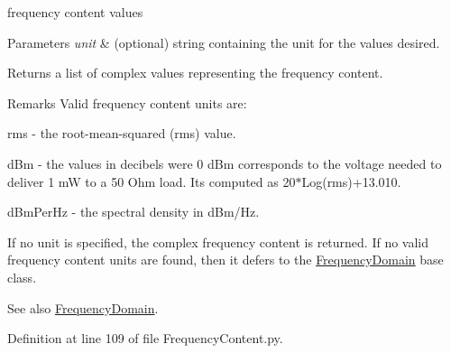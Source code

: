 frequency content values 


\begin{DoxyParams}{Parameters}
{\em unit} & (optional) string containing the unit for the values desired. \\
\hline
\end{DoxyParams}
\begin{DoxyReturn}{Returns}
a list of complex values representing the frequency content. 
\end{DoxyReturn}
\begin{DoxyRemark}{Remarks}
Valid frequency content units are\+:~\newline

\begin{DoxyItemize}
\item \textquotesingle{}rms\textquotesingle{} -\/ the root-\/mean-\/squared (rms) value.
\item \textquotesingle{}d\+Bm\textquotesingle{} -\/ the values in decibels were 0 d\+Bm corresponds to the voltage needed to deliver 1 mW to a 50 Ohm load. It\textquotesingle{}s computed as 20$\ast$\+Log(rms)+13.010.
\item \textquotesingle{}d\+Bm\+Per\+Hz\textquotesingle{} -\/ the spectral density in d\+Bm/\+Hz.
\end{DoxyItemize}
\end{DoxyRemark}
If no unit is specified, the complex frequency content is returned. If no valid frequency content units are found, then it defers to the \hyperlink{namespaceSignalIntegrity_1_1FrequencyDomain_1_1FrequencyDomain}{Frequency\+Domain} base class.

\begin{DoxySeeAlso}{See also}
\hyperlink{namespaceSignalIntegrity_1_1FrequencyDomain_1_1FrequencyDomain}{Frequency\+Domain}. 
\end{DoxySeeAlso}


Definition at line 109 of file Frequency\+Content.\+py.

\mbox{\label{classSignalIntegrity_1_1FrequencyDomain_1_1FrequencyContent_1_1FrequencyContent_af833a7687c414346de1e2ffab6b47d5c}} 
